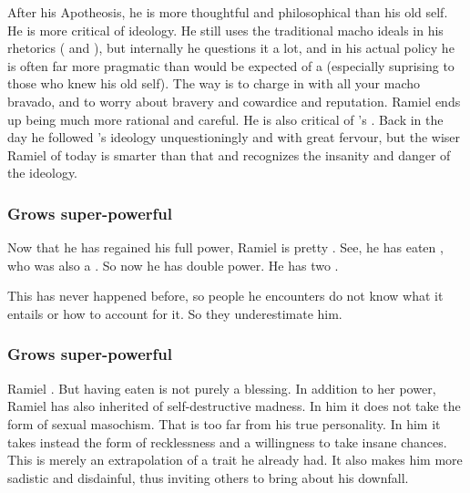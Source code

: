 After his Apotheosis, he is more thoughtful and philosophical than his old self. 
He is more critical of \Mystraacht ideology. 
He still uses the traditional \Mystraacht macho ideals in his rhetorics ( and ), but internally he questions it a lot, and in his actual policy he is often far more pragmatic than would be expected of a \Mystraacht (especially suprising to those who knew his old self). 
The \Mystraacht way is to charge in with all your macho bravado, and to worry about bravery and cowardice and reputation. 
Ramiel ends up being much more rational and careful.
He is also critical of \Zachirah's . 
Back in the day he followed \Zachirah's ideology unquestioningly and with great fervour, but the wiser Ramiel of today is smarter than that and recognizes the insanity and danger of the ideology. 





\subsubsection{Grows super-powerful}
Now that he has regained his full \sathariah{} power, Ramiel is pretty \uber. 
See, he has eaten \Belzir, who was also a \sathariah. 
So now he has double \sathariah{} power. 
He has two . 

This has never happened before, so people he encounters do not know what it entails or how to account for it. 
So they underestimate him. 





\subsubsection{Grows super-powerful}
Ramiel .
But having eaten \Shiaraid is not purely a blessing. 
In addition to her power, Ramiel has also inherited  of self-destructive madness. 
In him it does not take the form of sexual masochism. 
That is too far from his true personality. 
In him it takes instead the form of recklessness and a willingness to take insane chances. 
This is merely an extrapolation of a trait he already had. 
It also makes him more sadistic and disdainful, thus inviting others to bring about his downfall. 

